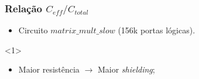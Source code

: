 \documentclass[10pt,a4paper]{beamer}
\begin{document}
		\begin{frame}
			\frametitle{Relação $C_{eff} / C_{total}$}
			\begin{itemize}
				\item Circuito $matrix\_mult\_slow$ (156k portas lógicas).
			\end{itemize}
			\begin{center}
				<1>
			\end{center}

			\begin{itemize}
				\item Maior resistência $\to$ Maior \textit{shielding};
			\end{itemize}
		\end{frame}
\end{document}
